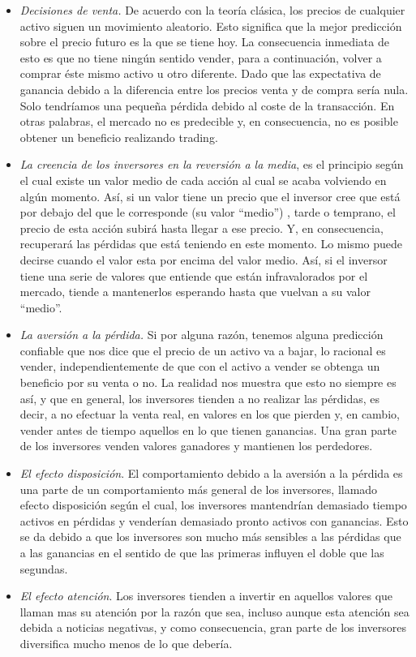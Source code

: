 \begin{itemize}
	\item \emph{Decisiones de venta. }
	De acuerdo con la teoría clásica, los precios de cualquier activo siguen un movimiento aleatorio. Esto significa que la mejor predicción sobre el precio futuro es la que se tiene hoy. La consecuencia inmediata de esto es que no tiene ningún sentido vender, para a continuación, volver a comprar éste mismo activo u otro diferente.
	Dado que las expectativa de ganancia debido a la diferencia entre los precios venta y de compra sería nula. Solo tendríamos una pequeña pérdida debido al coste de la transacción.
	En otras palabras, el mercado no es predecible y, en consecuencia, no es posible obtener un beneficio realizando trading. 

	\item \emph{La creencia de los inversores en la reversión a la media}, es el principio según el cual existe un valor medio de cada acción al cual se acaba volviendo en algún momento. Así, si un valor tiene un precio que el inversor cree que está por debajo del que le corresponde (su valor “medio”) , tarde o temprano, el precio de esta acción subirá hasta llegar a ese precio. Y, en consecuencia, recuperará las pérdidas que está teniendo en este momento. Lo mismo puede decirse cuando el valor esta por encima del valor medio. Así, si el inversor tiene una serie de valores que entiende que están infravalorados por el mercado, tiende a mantenerlos esperando hasta que vuelvan a su valor “medio”.  	

	\item \emph{La aversión a la pérdida. } Si por alguna razón, tenemos alguna predicción confiable que nos dice que el precio de un activo va a bajar, lo racional es vender, independientemente de que con el activo a vender se obtenga un beneficio por su venta o no.
	La realidad nos muestra que esto no siempre es así, y que en general, los inversores tienden a no realizar las pérdidas, es decir, a no efectuar la venta real, en valores en los que pierden y, en cambio, vender antes de tiempo aquellos en lo que tienen ganancias. Una gran parte de los inversores venden valores ganadores y mantienen los perdedores.
	
	\item \emph{El efecto disposición}. El comportamiento debido a la aversión a la pérdida es una parte de un comportamiento más general de los inversores, llamado efecto disposición según el cual, los inversores mantendrían demasiado tiempo activos en pérdidas y venderían demasiado pronto activos con ganancias. Esto se da debido a que los inversores son mucho más sensibles a las pérdidas que a las ganancias en el sentido de que las primeras influyen el doble que las segundas.
	
	\item \emph{El efecto atención}. Los inversores tienden a invertir en aquellos valores que llaman mas su atención por la razón que sea, incluso aunque esta atención sea debida a noticias negativas, y como consecuencia, gran parte de los inversores diversifica mucho menos de lo que debería.
\end{itemize}

